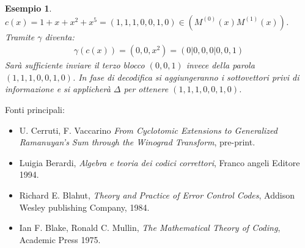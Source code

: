 \documentclass[mathserif]{beamer}
\newtheorem{esempio}{Esempio}
\begin{document}
\begin{frame}
    \begin{esempio}
      $c(x) = 1 + x + x^2 + x^5 = (1,1,1,0,0,1,0)\in (M^{(0)}(x)M^{(1)}(x))$.\\ Tramite $\gamma$ diventa:
      \begin{align*}
	  \gamma(c(x)) = (0,0,x^2) = (0|0,0,0|0,0,1)
      \end{align*}
      Sarà sufficiente inviare il terzo blocco $(0,0,1)$ invece della parola $(1,1,1,0,0,1,0)$. In fase di decodifica si aggiungeranno i sottovettori privi di informazione e si applicherà $\Delta$ per ottenere $(1,1,1,0,0,1,0)$.
    \end{esempio}
\end{frame}

\thispagestyle{empty}
\begin{frame}
Fonti principali:
    \begin{itemize}
      \item U. Cerruti, F. Vaccarino \emph{From Cyclotomic Extensions to Generalized
	    Ramanuyan's Sum through the Winograd Transform}, pre-print.    
      \item Luigia Berardi, \emph{Algebra e teoria dei codici correttori}, Franco angeli
	    Editore 1994.
      \item Richard E. Blahut, \emph{Theory and Practice of Error Control Codes}, 
	    Addison Wesley publishing Company, 1984.
      \item Ian F. Blake, Ronald C. Mullin, \emph{The Mathematical Theory of Coding},
	    Academic Press 1975.
      
    \end{itemize}
\end{frame}
\end{document}
